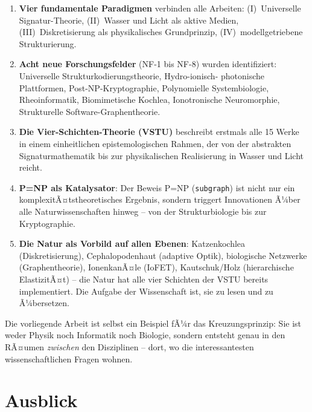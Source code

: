 ﻿\documentclass[a4paper,12pt]{scrreprt}
\theoremstyle{definition}
\begin{document}
\begin{enumerate}
  \item \textbf{Vier fundamentale Paradigmen} verbinden alle Arbeiten:
    (I)~Universelle Signatur-Theorie, (II)~Wasser und Licht als aktive
    Medien, (III)~Diskretisierung als physikalisches Grundprinzip,
    (IV)~modellgetriebene Strukturierung.

  \item \textbf{Acht neue Forschungsfelder} (NF-1 bis NF-8) wurden
    identifiziert: Universelle Strukturkodierungstheorie, Hydro-ionisch-
    photonische Plattformen, Post-NP-Kryptographie, Polynomielle
    Systembiologie, Rheoinformatik, Biomimetische Kochlea, Ionotronische
    Neuromorphie, Strukturelle Software-Graphentheorie.

  \item \textbf{Die Vier-Schichten-Theorie (VSTU)} beschreibt erstmals
    alle 15 Werke in einem einheitlichen epistemologischen Rahmen,
    der von der abstrakten Signaturmathematik bis zur physikalischen
    Realisierung in Wasser und Licht reicht.

  \item \textbf{P=NP als Katalysator}: Der Beweis P=NP (\texttt{subgraph})
    ist nicht nur ein komplexitÃ¤tstheoretisches Ergebnis, sondern
    triggert Innovationen Ã¼ber alle Naturwissenschaften hinweg -- von der
    Strukturbiologie bis zur Kryptographie.

  \item \textbf{Die Natur als Vorbild auf allen Ebenen}: Katzenkochlea
    (Diskretisierung), Cephalopodenhaut (adaptive Optik), biologische
    Netzwerke (Graphentheorie), IonenkanÃ¤le (IoFET), Kautschuk/Holz
    (hierarchische ElastizitÃ¤t) -- die Natur hat alle vier Schichten
    der VSTU bereits implementiert. Die Aufgabe der Wissenschaft ist,
    sie zu lesen und zu Ã¼bersetzen.
\end{enumerate}

\bigskip
\noindent
Die vorliegende Arbeit ist selbst ein Beispiel fÃ¼r das Kreuzungsprinzip:
Sie ist weder Physik noch Informatik noch Biologie, sondern entsteht genau
in den RÃ¤umen \emph{zwischen} den Disziplinen -- dort, wo die interessantesten
wissenschaftlichen Fragen wohnen.

\section{Ausblick}
\label{sec:ausblick}
\end{document}
